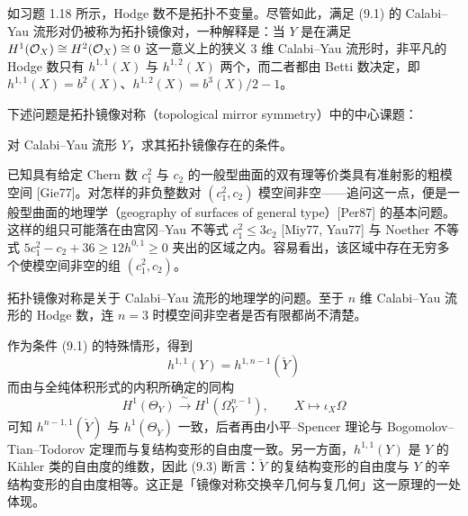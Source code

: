 \begin{remark}
如习题 1.18 所示，Hodge 数不是拓扑不变量。尽管如此，满足 (9.1) 的 Calabi--Yau 流形对仍被称为拓扑镜像对，一种解释是：当 $Y$ 是在满足 $H^1(\mathcal{O}_X)\cong H^2(\mathcal{O}_X)\cong 0$ 这一意义上的狭义 3 维 Calabi--Yau 流形时，非平凡的 Hodge 数只有 $h^{1,1}(X)$ 与 $h^{1,2}(X)$ 两个，而二者都由 Betti 数决定，即 $h^{1,1}(X)=b^2(X)$、$h^{1,2}(X)=b^3(X)/2-1$。
\end{remark}

下述问题是拓扑镜像对称（topological mirror symmetry）中的中心课题：

\begin{problem}
对 Calabi--Yau 流形 $Y$，求其拓扑镜像存在的条件。
\end{problem}

已知具有给定 Chern 数 $c_1^2$ 与 $c_2$ 的一般型曲面的双有理等价类具有准射影的粗模空间 [Gie77]。对怎样的非负整数对 $(c_1^2,c_2)$ 模空间非空——追问这一点，便是一般型曲面的地理学（geography of surfaces of general type）[Per87] 的基本问题。这样的组只可能落在由宫冈--Yau 不等式 $c_1^2\le 3c_2$ [Miy77, Yau77] 与 Noether 不等式 $5c_1^2-c_2+36\ge 12h^{0,1}\ge 0$ 夹出的区域之内。容易看出，该区域中存在无穷多个使模空间非空的组 $(c_1^2,c_2)$。

拓扑镜像对称是关于 Calabi--Yau 流形的地理学的问题。至于 $n$ 维 Calabi--Yau 流形的 Hodge 数，连 $n=3$ 时模空间非空者是否有限都尚不清楚。

作为条件 (9.1) 的特殊情形，得到
\begin{equation}
  h^{1,1}(Y)=h^{1,n-1}(\check Y)
  \tag{9.3}
\end{equation}
而由与全纯体积形式的内积所确定的同构
\begin{equation}
  H^1(\Theta_Y)\xrightarrow{\ \sim\ }H^1(\Omega_Y^{n-1}),\qquad X\mapsto\iota_X\Omega
  \tag{9.4}
\end{equation}
可知 $h^{n-1,1}(\check Y)$ 与 $h^1(\Theta_{\check Y})$ 一致，后者再由小平--Spencer 理论与 Bogomolov--Tian--Todorov 定理而与复结构变形的自由度一致。另一方面，$h^{1,1}(Y)$ 是 $Y$ 的 Kähler 类的自由度的维数，因此 (9.3) 断言：$\check Y$ 的复结构变形的自由度与 $Y$ 的辛结构变形的自由度相等。这正是「镜像对称交换辛几何与复几何」这一原理的一处体现。

